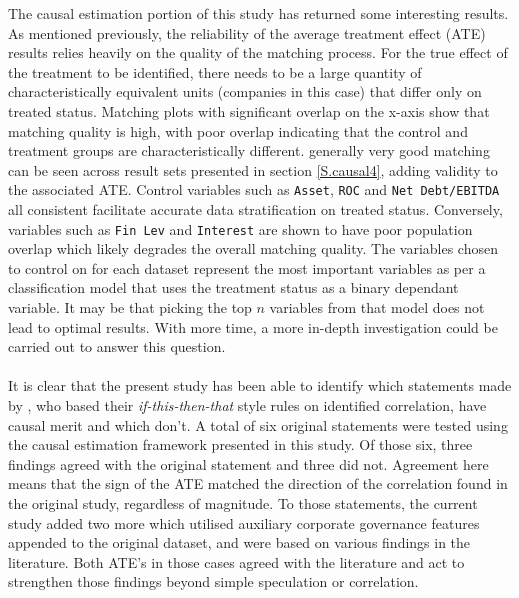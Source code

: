 {The causal estimation portion of this study has returned some interesting results. As mentioned previously, the reliability of the average treatment effect (ATE) results relies heavily on the quality of the matching process. For the true effect of the treatment to be identified, there needs to be a large quantity of characteristically equivalent units (companies in this case) that differ only on treated status. Matching plots with significant overlap on the x-axis show that matching quality is high, with poor overlap indicating that the control and treatment groups are characteristically different. generally very good matching can be seen across result sets presented in section \ref{S.causal4}, adding validity to the associated ATE. Control variables such as \texttt{Asset}, \texttt{ROC} and \texttt{Net Debt/EBITDA} all consistent facilitate accurate data stratification on treated status. Conversely, variables such as \texttt{Fin Lev} and \texttt{Interest} are shown to have poor population overlap which likely degrades the overall matching quality. The variables chosen to control on for each dataset represent the most important variables as per a classification model that uses the treatment status as a binary dependant variable. It may be that picking the top $n$ variables from that model does not lead to optimal results. With more time, a more in-depth investigation could be carried out to answer this question. \\\\
It is clear that the present study has been able to identify which statements made by \cite{moldovan2015learning}, who based their {\it if-this-then-that} style rules on identified correlation, have causal merit and which don't. A total of six original statements were tested using the causal estimation framework presented in this study. Of those six, three findings agreed with the original statement and three did not. Agreement here means that the sign of the ATE matched the direction of the correlation found in the original study, regardless of magnitude. To those statements, the current study added two more which utilised auxiliary corporate governance features appended to the original dataset, and were based on various findings in the literature. Both ATE's in those cases agreed with the literature and act to strengthen those findings beyond simple speculation or correlation.   }
